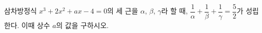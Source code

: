 삼차방정식 $x^3+2x^2+ax-4=0$의 세 근을 $\alpha$, $\beta$, $\gamma$라 할 때, $\dfrac{1}{\alpha}+\dfrac{1}{\beta}+\dfrac{1}{\gamma}=\dfrac{5}{2}$가 성립한다. 이때 상수 $a$의 값을 구하시오.

